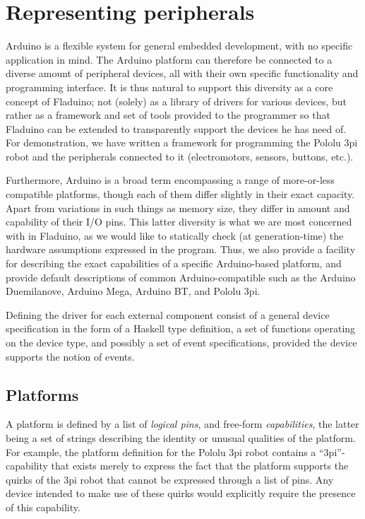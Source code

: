 \documentclass[a4paper, oneside, final]{memoir}
\begin{document}
\section{Representing peripherals}
Arduino is a flexible system for general embedded development, with no
specific application in mind.  The Arduino platform can therefore be
connected to a diverse amount of peripheral devices, all with their
own specific functionality and programming interface.  It is thus
natural to support this diversity as a core concept of Fladuino; not
(solely) as a library of drivers for various devices, but rather as a
framework and set of tools provided to the programmer so that Fladuino
can be extended to transparently support the devices he has need of.
For demonstration, we have  written a
framework for programming the Pololu 3pi robot and the peripherals
connected to it (electromotors, sensors, buttons, etc.).

Furthermore, Arduino is a broad term encompassing a range of
more-or-less compatible platforms, though each of them differ slightly
in their exact capacity.  Apart from variations in such things as
memory size, they differ in amount and capability of their I/O pins.
This latter diversity is what we are most concerned with in Fladuino,
as we would like to statically check (at generation-time) the
hardware assumptions expressed in the program.  Thus, we also provide
a facility for describing the exact capabilities of a specific
Arduino-based platform, and provide default descriptions of common
Arduino-compatible such as the Arduino Duemilanove, Arduino Mega,
Arduino BT, and Pololu 3pi.

Defining the driver for each external component consist of a general
device specification in the form of a Haskell type definition, a set
of functions operating on the device type, and possibly a set of event
specifications, provided the device supports the notion of events.


\subsection{Platforms}
\label{capabilities}
A platform is defined by a list of \textit{logical pins}, and
free-form \textit{capabilities}, the latter being a set of strings
describing the identity or unusual qualities of the platform.  For
example, the platform definition for the Pololu 3pi robot contains a
``3pi''-capability that exists merely to express the fact that the
platform supports the quirks of the 3pi robot that cannot be expressed
through a list of pins.  Any device intended to make use of these
quirks would explicitly require the presence of this capability.
\end{document}
